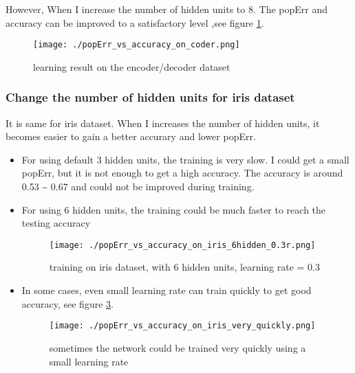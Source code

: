 \documentclass[11pt]{article}
\begin{document}
However, When I increase the number of hidden units to 8. The popErr and accuracy can be improved to a satisfactory level ,see figure \ref{fig-coder-8hidden}.

\begin{figure}[htb]
\centering
\texttt{[image: ./popErr\_vs\_accuracy\_on\_coder.png]}
\caption{learning result on the encoder/decoder dataset \label{fig-coder-8hidden}}
\end{figure}


\subsubsection{Change the number of hidden units for iris dataset}
\label{sec-3-2-2}
It is same for iris dataset. When I increases the number of hidden units, it becomes easier to gain a better accurary and lower popErr.
\begin{itemize}
\item For using default 3 hidden units, the training is very slow. I could get a small popErr, but it is not enough to get a high accuracy. The accuracy is around 0.53 \textasciitilde{} 0.67 and could not be improved during training.
\item For using 6 hidden units, the training could be much faster to reach the testing accuracy
\begin{figure}[htb]
\centering
\texttt{[image: ./popErr\_vs\_accuracy\_on\_iris\_6hidden\_0.3r.png]}
\caption{training on iris dataset, with 6 hidden units, learning rate = 0.3 \label{fig-iris-6hidden-larger-learning-rate}}
\end{figure}
\item In some cases, even small learning rate can train quickly to get good accuracy, see figure \ref{fig-iris-6hidden-quick-learn}.
\begin{figure}[htb]
\centering
\texttt{[image: ./popErr\_vs\_accuracy\_on\_iris\_very\_quickly.png]}
\caption{sometimes the network could be trained very quickly using a small learning rate \label{fig-iris-6hidden-quick-learn}}
\end{figure}
\end{itemize}
\end{document}
